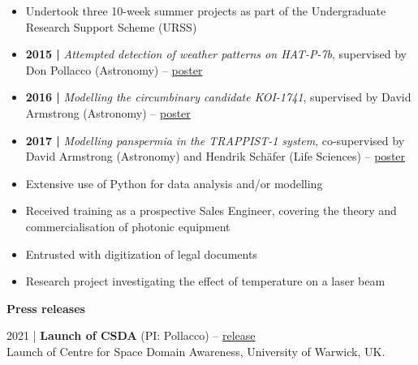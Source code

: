 \documentclass[10pt,a4paper]{altacv}
\begin{document}
\divider

\begin{itemize}
	\item Undertook three 10-week summer projects as part of the Undergraduate Research Support Scheme (URSS)
	\item \textbf{2015 |} \textit{Attempted detection of weather patterns on HAT-P-7b}, supervised by Don Pollacco (Astronomy) -- \href{https://warwick.ac.uk/fac/sci/physics/research/astro/people/jamesblake/urss_poster_2015_jb.pdf}{poster}
	\item \textbf{2016 |} \textit{Modelling the circumbinary candidate KOI-1741}, supervised by David Armstrong (Astronomy) -- \href{https://warwick.ac.uk/fac/sci/physics/research/astro/people/jamesblake/urss_poster_2016_jb.pdf}{poster}
	\item \textbf{2017 |} \textit{Modelling panspermia in the TRAPPIST-1 system}, co-supervised by David Armstrong (Astronomy) and Hendrik Sch{\"a}fer (Life Sciences) -- \href{https://warwick.ac.uk/fac/sci/physics/research/astro/people/jamesblake/urss_poster_2017_jb.pdf}{poster}
	\item Extensive use of Python for data analysis and/or modelling
\end{itemize}

\divider

\begin{itemize}
	\item Received training as a prospective Sales Engineer, covering the theory and commercialisation of photonic equipment
	\item Entrusted with digitization of legal documents 
	\item Research project investigating the effect of temperature on a laser beam
\end{itemize}

\medskip


\normalsize \textbf{Press releases}

\medskip

\small 2021 | \textbf{Launch of CSDA} (PI: Pollacco) -- \href{https://warwick.ac.uk/newsandevents/pressreleases/space_junk_traffic/}{release} \\
Launch of Centre for Space Domain Awareness, University of Warwick, UK.
\end{document}
